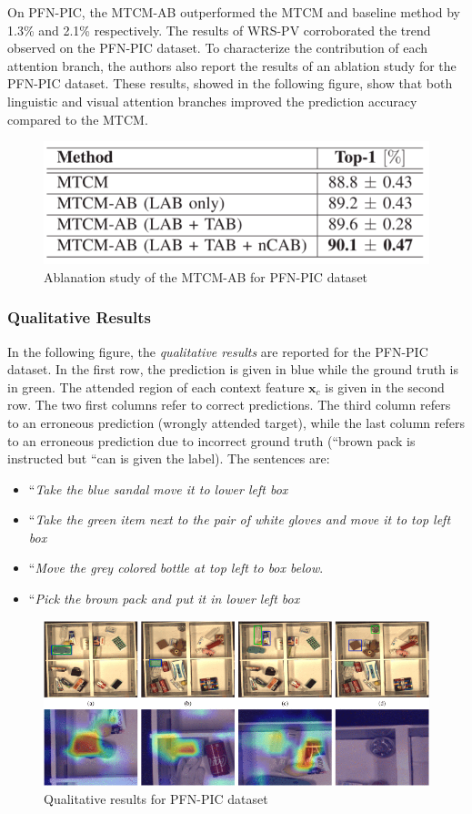 On PFN-PIC, the MTCM-AB outperformed the MTCM and baseline method by
1.3\% and 2.1\% respectively. The results of WRS-PV corroborated the
trend observed on the PFN-PIC dataset. To characterize the contribution
of each attention branch, the authors also report the results of an
ablation study for the PFN-PIC dataset. These results, showed in the
following figure, show that both linguistic and visual attention
branches improved the prediction accuracy compared to the MTCM.

\begin{figure}[h!]
\centering
\includegraphics[width=0.75\linewidth]{images/MTCMablanation.png}
\caption{Ablanation study of the MTCM-AB for PFN-PIC dataset}
\end{figure}

\subsubsection{Qualitative Results}\label{header-n330}

In the following figure, the \emph{qualitative results} are reported for
the PFN-PIC dataset. In the first row, the prediction is given in blue
while the ground truth is in green. The attended region of each context
feature ${\mathbf x}_c$ is given in the second row. The two first columns
refer to correct predictions. The third column refers to an erroneous
prediction (wrongly attended target), while the last column refers to an
erroneous prediction due to incorrect ground truth (``brown pack is
instructed but ``can is given the label). The sentences are:

\begin{itemize}
\item
  ``\emph{Take the blue sandal move it to lower left box}
\item
  ``\emph{Take the green item next to the pair of white gloves and move
  it to top left box}
\item
  ``\emph{Move the grey colored bottle at top left to box below}.
\item
  ``\emph{Pick the brown pack and put it in lower left box}
\end{itemize}
\newpage
\begin{figure}[h!]
\centering
\includegraphics[width=0.8\linewidth]{images/MTMCqualres1.png}
\caption{Qualitative results for PFN-PIC dataset}
\end{figure}

